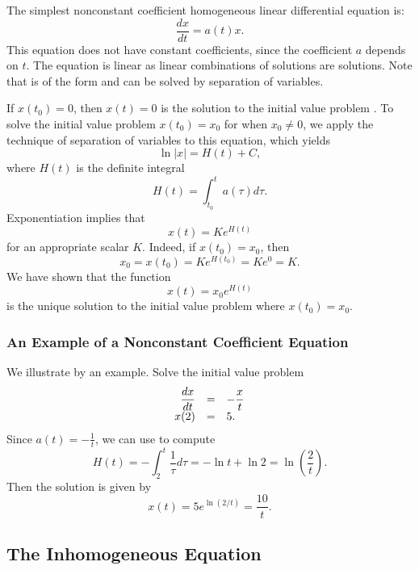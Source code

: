 \documentclass{ximera}
\begin{document}
The simplest nonconstant coefficient homogeneous 
linear differential equation is:
\begin{equation}   \label{eq:linhomo1}
\frac{dx}{dt}  =  a(t)x.
\end{equation}
This equation does not have constant coefficients, since the coefficient 
$a$ depends on $t$.  The equation is linear as linear combinations of 
solutions are solutions.  Note that  is of the form 
 and can be solved by separation of variables. 

If $x(t_0)=0$, then $x(t)=0$ is the solution to the initial value problem
.
To solve the initial value problem $x(t_0)=x_0$ for 
when $x_0\neq 0$, we apply the technique of separation of variables to 
this equation, which yields
\[
\ln|x| = H(t) + C,
\]
where $H(t)$ is the definite integral
\begin{equation}   \label{e:H(t)}
H(t)=\int_{t_0}^t a(\tau)d\tau.
\end{equation}
Exponentiation implies that
\[
x(t) = Ke^{H(t)}
\]
for an appropriate scalar $K$.  Indeed, if $x(t_0)=x_0$, then
\[
x_0 = x(t_0) = Ke^{H(t_0)} = Ke^0 = K.
\]
We have shown that the function 
\begin{equation} \label{E:ssv}
x(t) = x_0 e^{H(t)}
\end{equation}
is the unique solution 
to the initial value problem 
 where $x(t_0)=x_0$.

\subsubsection*{An Example of a Nonconstant Coefficient Equation}

We illustrate  by an example. Solve the initial value problem
\[
\begin{array}{rcl}
\displaystyle \frac{dx}{dt} & = & -\displaystyle \frac{x}{t} \\
x(2) & = & 5.
\end{array}
\]
Since $a(t)=-\frac{1}{t}$, we can use  to compute
\[
H(t)=-\int_2^t \frac{1}{\tau}d\tau = -\ln t +\ln 2 =
\ln\left(\frac{2}{t}\right).
\]
Then the solution  is given by
\[
x(t) = 5 e^{\ln(2/t)} = \frac{10}{t}.
\]

\subsection*{The Inhomogeneous Equation}
\end{document}
